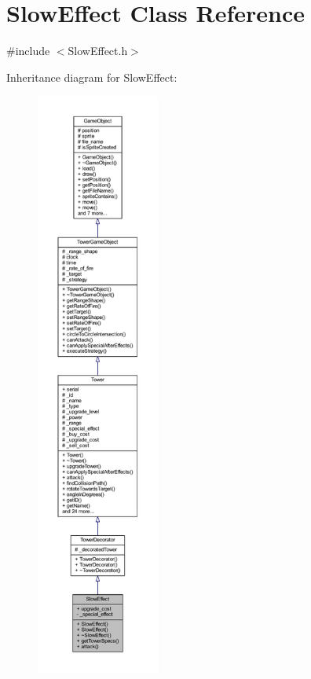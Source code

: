 \hypertarget{class_slow_effect}{\section{Slow\+Effect Class Reference}
\label{class_slow_effect}
}


{\ttfamily \#include $<$Slow\+Effect.\+h$>$}



Inheritance diagram for Slow\+Effect\+:
\nopagebreak
\begin{figure}[H]
\begin{center}
\leavevmode
\includegraphics[height=550pt]{class_slow_effect__inherit__graph}
\end{center}
\end{figure}



